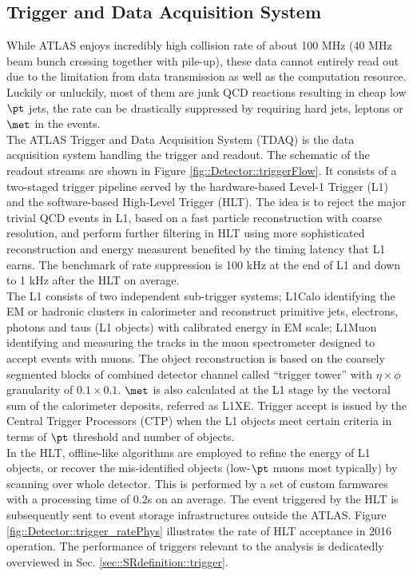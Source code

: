 \subsection{Trigger and Data Acquisition System}\label{sed::Detector::TDAQ}
While ATLAS enjoys incredibly high collision rate of about 100 MHz (40 MHz beam bunch crossing together with pile-up),
these data cannot entirely read out due to the limitation from data transmission as well as the computation resource.
Luckily or unluckily, most of them are junk QCD reactions resulting in cheap low $\pt$ jets, 
the rate can be drastically suppressed by requiring hard jets, leptons or $\met$ in the events. \\

The ATLAS Trigger and Data Acquisition System (TDAQ) \cite{ATLASTrigger2015} is the data acquisition system handling the trigger and readout. 
The schematic of the readout streams are shown in Figure \ref{fig::Detector::triggerFlow}.
It consists of a two-staged trigger pipeline served by the hardware-based Level-1 Trigger (L1) and the software-based High-Level Trigger (HLT).
The idea is to reject the major trivial QCD events in L1, based on a fast particle reconstruction with coarse resolution, and perform further filtering in HLT using more sophisticated reconstruction and energy measurent benefited by the timing latency that L1 earns. The benchmark of rate suppression is 100 kHz at the end of L1 and down to 1 kHz after the HLT on average. \\
The L1 consists of two independent sub-trigger systems; L1Calo identifying the EM or hadronic clusters in calorimeter and reconstruct primitive jets, electrons, photons and taus (L1 objects) with calibrated energy in EM scale; L1Muon identifying and measuring the tracks in the muon spectrometer designed to accept events with muons. 
The object reconstruction is based on the coarsely segmented blocks of combined detector channel called ``trigger tower'' with $\eta\times\phi$ granularity of $0.1 \times 0.1$. 
$\met$ is also calculated at the L1 stage by the vectoral sum of the calorimeter deposits, referred as L1XE. Trigger accept is issued by the Central Trigger Processors (CTP) when the L1 objects meet certain criteria in terms of $\pt$ threshold and number of objects.  \\

In the HLT, offline-like algorithms are employed to refine the energy of L1 objects, or recover the mis-identified objects (low-$\pt$ muons most typically) by scanning over whole detector. 
This is performed by a set of custom farmwares with a processing time of 0.2s on an average. 
The event triggered by the HLT is subsequently sent to event storage infrastructures outside the ATLAS. 
Figure \ref{fig::Detector::trigger_ratePhys} illustrates the rate of HLT acceptance in 2016 operation. 
The performance of triggers relevant to the analysis is dedicatedly overviewed in Sec. \ref{sec::SRdefinition::trigger}.

